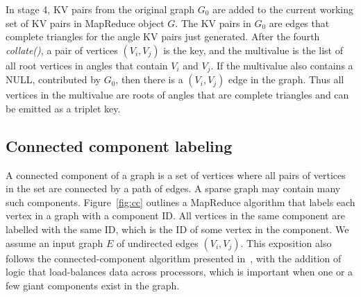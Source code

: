 In stage 4, KV pairs from the original graph $G_0$ are added to the
current working set of KV pairs in MapReduce object $G$.  The KV pairs
in $G_0$ are edges that complete triangles for the angle KV pairs just
generated.  After the fourth {\it collate()}, a pair of vertices
$(V_i,V_j)$ is the key, and the multivalue is the list of all root
vertices in angles that contain $V_i$ and $V_j$.  If the multivalue
also contains a NULL, contributed by $G_0$, then there is a
$(V_i,V_j)$ edge in the graph.  Thus all vertices in the multivalue
are roots of angles that are complete triangles and can be emitted as
a triplet key.

\subsection{Connected component labeling}

A connected component of a graph is a set of vertices where all pairs
of vertices in the set are connected by a path of edges.  A sparse
graph may contain many such components.  Figure~\ref{fig:cc} outlines
a MapReduce algorithm that labels each vertex in a graph with a
component ID.  All vertices in the same component are labelled with
the same ID, which is the ID of some vertex in the component.  We
assume an input graph $E$ of undirected edges $(V_i,V_j)$.  This
exposition also follows the connected-component algorithm presented
in~\cite{Cohen09}, with the addition of logic that load-balances data
across processors, which is important when one or a few giant
components exist in the graph.

